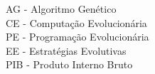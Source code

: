 \listatabelas
 
\listasiglas
	{%
		AG - Algoritmo Genético \\
		CE - Computação Evolucionária \\
		PE - Programação Evolucionária \\
		EE - Estratégias Evolutivas \\
		PIB - Produto Interno Bruto
	}

\sumario

\newpage





